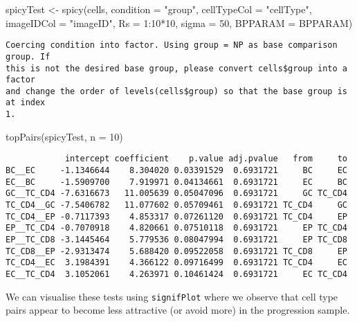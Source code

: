 \documentclass[
  letterpaper,
  DIV=11,
  numbers=noendperiod]{scrreprt}
\newenvironment{Shaded}{\begin{snugshade}}{\end{snugshade}}
\newcommand{\AttributeTok}[1]{\textcolor[rgb]{0.40,0.45,0.13}{#1}}
\newcommand{\DecValTok}[1]{\textcolor[rgb]{0.68,0.00,0.00}{#1}}
\newcommand{\FunctionTok}[1]{\textcolor[rgb]{0.28,0.35,0.67}{#1}}
\newcommand{\NormalTok}[1]{\textcolor[rgb]{0.00,0.23,0.31}{#1}}
\newcommand{\OtherTok}[1]{\textcolor[rgb]{0.00,0.23,0.31}{#1}}
\newcommand{\SpecialCharTok}[1]{\textcolor[rgb]{0.37,0.37,0.37}{#1}}
\newcommand{\StringTok}[1]{\textcolor[rgb]{0.13,0.47,0.30}{#1}}
\begin{document}
\begin{Shaded}
\begin{Highlighting}[]
\NormalTok{spicyTest }\OtherTok{\textless{}{-}} \FunctionTok{spicy}\NormalTok{(cells,}
                   \AttributeTok{condition =} \StringTok{"group"}\NormalTok{,}
                   \AttributeTok{cellTypeCol =} \StringTok{"cellType"}\NormalTok{,}
                   \AttributeTok{imageIDCol =} \StringTok{"imageID"}\NormalTok{,}
                   \AttributeTok{Rs =} \DecValTok{1}\SpecialCharTok{:}\DecValTok{10}\SpecialCharTok{*}\DecValTok{10}\NormalTok{,}
                   \AttributeTok{sigma =} \DecValTok{50}\NormalTok{,}
                   \AttributeTok{BPPARAM =}\NormalTok{ BPPARAM)}
\end{Highlighting}
\end{Shaded}

\begin{verbatim}
Coercing condition into factor. Using group = NP as base comparison group. If
this is not the desired base group, please convert cells$group into a factor
and change the order of levels(cells$group) so that the base group is at index
1.
\end{verbatim}

\begin{Shaded}
\begin{Highlighting}[]
\FunctionTok{topPairs}\NormalTok{(spicyTest, }\AttributeTok{n =} \DecValTok{10}\NormalTok{)}
\end{Highlighting}
\end{Shaded}

\begin{verbatim}
            intercept coefficient    p.value adj.pvalue   from     to
BC__EC     -1.1346644    8.304020 0.03391529  0.6931721     BC     EC
EC__BC     -1.5909700    7.919971 0.04134661  0.6931721     EC     BC
GC__TC_CD4 -7.6316673   11.005639 0.05047096  0.6931721     GC TC_CD4
TC_CD4__GC -7.5406782   11.077602 0.05709461  0.6931721 TC_CD4     GC
TC_CD4__EP -0.7117393    4.853317 0.07261120  0.6931721 TC_CD4     EP
EP__TC_CD4 -0.7070918    4.820661 0.07510118  0.6931721     EP TC_CD4
EP__TC_CD8 -3.1445464    5.779536 0.08047994  0.6931721     EP TC_CD8
TC_CD8__EP -2.9313474    5.688420 0.09522058  0.6931721 TC_CD8     EP
TC_CD4__EC  3.1984391    4.366122 0.09716499  0.6931721 TC_CD4     EC
EC__TC_CD4  3.1052061    4.263971 0.10461424  0.6931721     EC TC_CD4
\end{verbatim}

We can visualise these tests using \texttt{signifPlot} where we observe
that cell type pairs appear to become less attractive (or avoid more) in
the progression sample.
\end{document}
